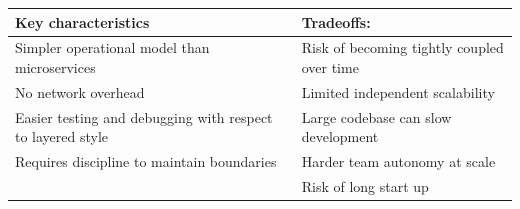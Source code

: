 \begin{table}[h!]
  \renewcommand{\arraystretch}{1.4}
  \centering
  \begin{tabular}{l l}
    \toprule
    \textbf{Key characteristics}                               & \textbf{Tradeoffs:
                                                                 }                          \\
    \midrule
    Simpler operational model than
    microservices                                              & Risk of becoming tightly coupled over time \\
    No network overhead                                        & Limited independent scalability            \\
    Easier testing and debugging with respect to layered style & Large codebase can slow development        \\
    Requires discipline to maintain boundaries                 & Harder team autonomy at scale              \\
                                                               & Risk of long start up                      \\
    \bottomrule
  \end{tabular}
\end{table}

